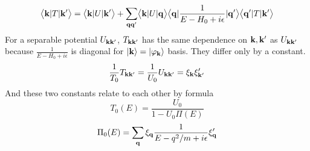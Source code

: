 		\begin{equation}
	\bigl<{\mathbf{k}{\lvert{T}\rvert}\mathbf{k}'}\bigr>=\bigl<{\mathbf{k}{\lvert{U}\rvert}\mathbf{k}'}\bigr>+\sum_{\mathbf{q}\mathbf{q}'}\bigl<{\mathbf{k}{\lvert{U}\rvert}\mathbf{q}}\bigr>\bigl<{\mathbf{q}{\lvert{\ensuremath{\frac{1}{E-H_0+i\epsilon}}}\rvert}\mathbf{q}'}\bigr>\bigl<{\mathbf{q}'{\lvert{T}\rvert}\mathbf{k}'}\bigr>
	\label{eq:}
	\end{equation}
	For a separable potential $U_{\mathbf{k}\mathbf{k}'}$, $T_{\mathbf{k}\mathbf{k}'}$ has the same dependence on $\mathbf{k},\mathbf{k}'$ as $U_{\mathbf{k}\mathbf{k}'}$ because $\frac{1}{E-H_0+i\epsilon}$ is diagonal for $\left|\mathbf{k}\right>=\left|\varphi_{\mathbf{k}}\right>$ basis.  They differ only by a constant.  
	\begin{equation}
	\frac{1}{T_0}T_{\mathbf{k}\mathbf{k}'}=\frac{1}{U_0}U_{\mathbf{k}\mathbf{k}'}=\xi_{\mathbf{k}}\xi^{\prime}_{\mathbf{k}'}
	\label{eq:}
	\end{equation}
And these two constants relate to each other by formula
\begin{equation}
T_{0}(E)=\frac{U_{0}}{1-U_{0}\Pi(E)}
\end{equation}
\begin{equation}
\Pi_{0}(E)=\sum_{\mathbf{q}}{\xi_{\mathbf{q}}\frac{1}{E-q^2/m+i\epsilon}\xi^{\prime}_{\mathbf{q}}}
\label{eq:}
\end{equation}
